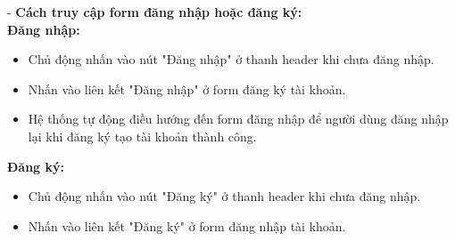 \indent \indent - \textbf{Cách truy cập form đăng nhập hoặc đăng ký:}\\
\indent \textbf{Đăng nhập:}
\begin{itemize}
    \item[1.] Chủ động nhấn vào nút "Đăng nhập" ở thanh header khi chưa đăng nhập.
    \item[2.] Nhấn vào liên kết "Đăng nhập" ở form đăng ký tài khoản.
    \item[3.] Hệ thống tự động điều hướng đến form đăng nhập để người dùng đăng nhập lại khi đăng ký tạo tài khoản thành công.
\end{itemize} 

\indent \textbf{Đăng ký:}
\begin{itemize}
    \item[1.] Chủ động nhấn vào nút "Đăng ký" ở thanh header khi chưa đăng nhập.
    \item[2.] Nhấn vào liên kết "Đăng ký" ở form đăng nhập tài khoản.
\end{itemize}


